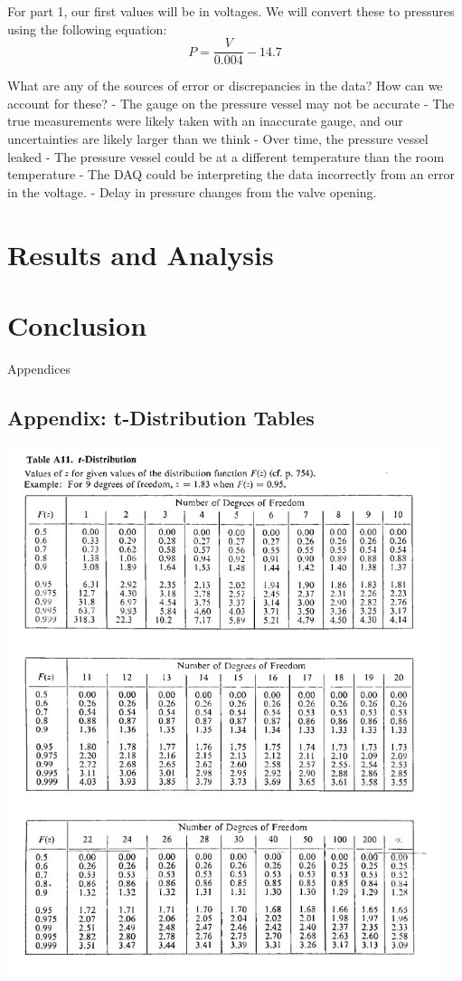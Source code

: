 \documentclass{article}
\begin{document}
For part 1, our first values will be in voltages. We will convert these to pressures using the following equation:
\[
P = \frac{V}{0.004} - 14.7
\]

What are any of the sources of error or discrepancies in the data? How can we account for these?
- The gauge on the pressure vessel may not be accurate
- The true measurements were likely taken with an inaccurate gauge, and our uncertainties are likely larger than we think
- Over time, the pressure vessel leaked
- The pressure vessel could be at a different temperature than the room temperature
- The DAQ could be interpreting the data incorrectly from an error in the voltage.
- Delay in pressure changes from the valve opening.


\section{Results and Analysis}

\section{Conclusion}

\newpage
\thispagestyle{empty}  %
\begin{center}
	\vspace*{\fill}
	{\Huge Appendices}
	\vspace*{\fill}
\end{center}

\newpage
\begin{appendices}
\pagestyle{fancy}
\renewcommand{\thefigure}{A\arabic{figure}}
\setcounter{figure}{0}

\section*{Appendix: t-Distribution Tables}
\hypertarget{1}{\includegraphics[width=0.95\textwidth]{t_distribution_Table_lecture3.png}}
\end{appendices}
\end{document}
